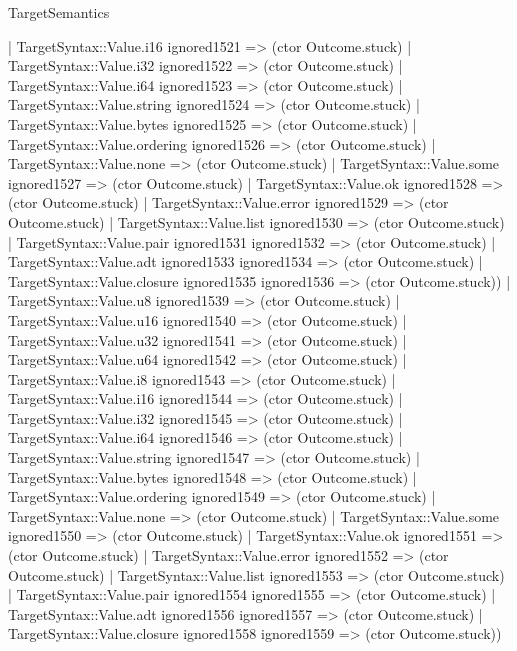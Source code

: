\begin{lexlean}{TargetSemantics}
\begin{semanticmodule}
{                | TargetSyntax::Value.i16 ignored1521 => (ctor Outcome.stuck)
                | TargetSyntax::Value.i32 ignored1522 => (ctor Outcome.stuck)
                | TargetSyntax::Value.i64 ignored1523 => (ctor Outcome.stuck)
                | TargetSyntax::Value.string ignored1524 => (ctor Outcome.stuck)
                | TargetSyntax::Value.bytes ignored1525 => (ctor Outcome.stuck)
                | TargetSyntax::Value.ordering ignored1526 => (ctor Outcome.stuck)
                | TargetSyntax::Value.none => (ctor Outcome.stuck)
                | TargetSyntax::Value.some ignored1527 => (ctor Outcome.stuck)
                | TargetSyntax::Value.ok ignored1528 => (ctor Outcome.stuck)
                | TargetSyntax::Value.error ignored1529 => (ctor Outcome.stuck)
                | TargetSyntax::Value.list ignored1530 => (ctor Outcome.stuck)
                | TargetSyntax::Value.pair ignored1531 ignored1532 => (ctor Outcome.stuck)
                | TargetSyntax::Value.adt ignored1533 ignored1534 => (ctor Outcome.stuck)
                | TargetSyntax::Value.closure ignored1535 ignored1536 => (ctor Outcome.stuck))
              | TargetSyntax::Value.u8 ignored1539 => (ctor Outcome.stuck)
              | TargetSyntax::Value.u16 ignored1540 => (ctor Outcome.stuck)
              | TargetSyntax::Value.u32 ignored1541 => (ctor Outcome.stuck)
              | TargetSyntax::Value.u64 ignored1542 => (ctor Outcome.stuck)
              | TargetSyntax::Value.i8 ignored1543 => (ctor Outcome.stuck)
              | TargetSyntax::Value.i16 ignored1544 => (ctor Outcome.stuck)
              | TargetSyntax::Value.i32 ignored1545 => (ctor Outcome.stuck)
              | TargetSyntax::Value.i64 ignored1546 => (ctor Outcome.stuck)
              | TargetSyntax::Value.string ignored1547 => (ctor Outcome.stuck)
              | TargetSyntax::Value.bytes ignored1548 => (ctor Outcome.stuck)
              | TargetSyntax::Value.ordering ignored1549 => (ctor Outcome.stuck)
              | TargetSyntax::Value.none => (ctor Outcome.stuck)
              | TargetSyntax::Value.some ignored1550 => (ctor Outcome.stuck)
              | TargetSyntax::Value.ok ignored1551 => (ctor Outcome.stuck)
              | TargetSyntax::Value.error ignored1552 => (ctor Outcome.stuck)
              | TargetSyntax::Value.list ignored1553 => (ctor Outcome.stuck)
              | TargetSyntax::Value.pair ignored1554 ignored1555 => (ctor Outcome.stuck)
              | TargetSyntax::Value.adt ignored1556 ignored1557 => (ctor Outcome.stuck)
              | TargetSyntax::Value.closure ignored1558 ignored1559 => (ctor Outcome.stuck))
}
\end{semanticmodule}
\end{lexlean}
